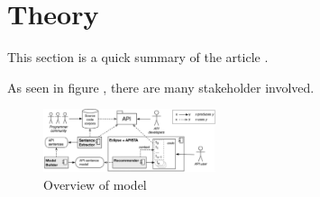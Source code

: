 \section{Theory}
This section is a quick summary of the article \cite{Santos2017stepwise}.

As seen in figure , there are many stakeholder involved.

\begin{figure}[H]
	\centering
	\includegraphics[width=2in]{./section-chapter1/images/overview.png}
	\caption{Overview of model}
	\label{fig:overview}
\end{figure}
